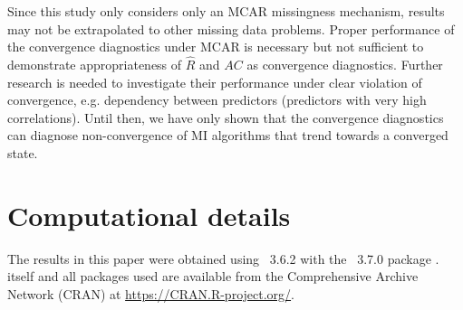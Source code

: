 \documentclass[article]{jss}
\begin{document}
% 

Since this study only considers only an MCAR missingness mechanism, results may not be extrapolated to other missing data problems. Proper performance of the convergence diagnostics under MCAR is necessary but not sufficient to demonstrate appropriateness of $\widehat{R}$ and $AC$ as convergence diagnostics. %
Further research is needed to investigate their performance under clear violation of convergence, e.g. dependency between predictors (predictors with very high correlations). 
Until then, we have only shown that the convergence diagnostics can diagnose non-convergence of MI algorithms that trend towards a converged state. %


\section*{Computational details}

The results in this paper were obtained using ~3.6.2 \cite{R} with the ~3.7.0 package \cite{mice}.  itself and all packages used are available from the Comprehensive  Archive Network (CRAN) at \url{https://CRAN.R-project.org/}.
\end{document}
